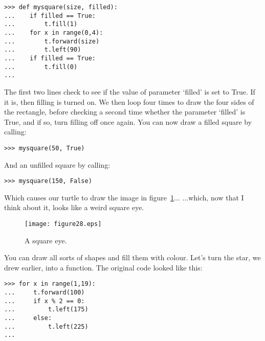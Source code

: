 \begin{listing}
\begin{verbatim}
>>> def mysquare(size, filled):
...    if filled == True:
...        t.fill(1)
...    for x in range(0,4):
...        t.forward(size)
...        t.left(90)
...    if filled == True:
...        t.fill(0)
...
\end{verbatim}
\end{listing}

The first two lines check to see if the value of parameter `filled' is set to True. If it is, then filling is turned on.  We then loop four times to draw the four sides of the rectangle, before checking a second time whether the parameter `filled' is True, and if so, turn filling off once again. You can now draw a filled square by calling:

\begin{listing}
\begin{verbatim}
>>> mysquare(50, True)
\end{verbatim}
\end{listing}

\noindent
And an unfilled square by calling:

\begin{listing}
\begin{verbatim}
>>> mysquare(150, False)
\end{verbatim}
\end{listing}

\noindent
Which causes our turtle to draw the image in figure~\ref{fig28}$\ldots$ $\ldots$which, now that I think about it, looks like a weird square eye.

\begin{figure}
\begin{center}
\texttt{[image: figure28.eps]}
\end{center}
\caption{A square eye.}\label{fig28}
\end{figure}

You can draw all sorts of shapes and fill them with colour. Let's turn the star, we drew earlier, into a function. The original code looked like this:

\begin{listing}
\begin{verbatim}
>>> for x in range(1,19):
...     t.forward(100)
...     if x % 2 == 0:
...         t.left(175)
...     else:
...         t.left(225)
...
\end{verbatim}
\end{listing}

